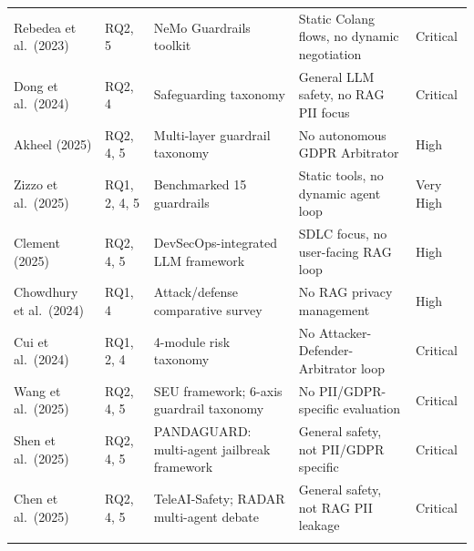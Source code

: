 \documentclass[12pt, a4paper]{article}
\begin{document}
\begin{small}
\begin{longtable}{L{3cm} C{1.2cm} L{3.5cm} L{3.5cm} C{1.5cm}}
Rebedea et al.\ (2023) & RQ2, 5 & NeMo Guardrails toolkit & Static Colang flows, no dynamic negotiation & Critical \\
Dong et al.\ (2024) & RQ2, 4 & Safeguarding taxonomy & General LLM safety, no RAG PII focus & Critical \\
Akheel (2025) & RQ2, 4, 5 & Multi-layer guardrail taxonomy & No autonomous GDPR Arbitrator & High \\
Zizzo et al.\ (2025) & RQ1, 2, 4, 5 & Benchmarked 15 guardrails & Static tools, no dynamic agent loop & Very High \\
Clement (2025) & RQ2, 4, 5 & DevSecOps-integrated LLM framework & SDLC focus, no user-facing RAG loop & High \\
Chowdhury et al.\ (2024) & RQ1, 4 & Attack/defense comparative survey & No RAG privacy management & High \\
Cui et al.\ (2024) & RQ1, 2, 4 & 4-module risk taxonomy & No Attacker-Defender-Arbitrator loop & Critical \\
Wang et al.\ (2025) & RQ2, 4, 5 & SEU framework; 6-axis guardrail taxonomy & No PII/GDPR-specific evaluation & Critical \\
Shen et al.\ (2025) & RQ2, 4, 5 & PANDAGUARD: multi-agent jailbreak framework & General safety, not PII/GDPR specific & Critical \\
Chen et al.\ (2025) & RQ2, 4, 5 & TeleAI-Safety; RADAR multi-agent debate & General safety, not RAG PII leakage & Critical \\

\midrule
{}
 \\
\midrule


\end{longtable}
\end{small}
\end{document}
